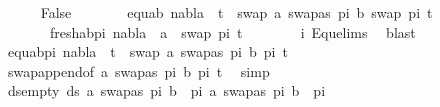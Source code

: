 \begin{isabellebody}
\isanewline
\ \ \ \ \isamarkupfalse%
\ False\isanewline
\ \ \ \ \isamarkupfalse%
\ \isamarkupfalse%
\ equ{\isacharunderscore}{\kern0pt}ab{\isacharcolon}{\kern0pt}\ {\isachardoublequoteopen}nabla\ {\isasymturnstile}\ t{}{\isacharprime}{\kern0pt}\ {\isasymapprox}\ swap\ {\isacharbrackleft}{\kern0pt}{\isacharparenleft}{\kern0pt}a{\isacharcomma}{\kern0pt}\ swapas\ pi{}\ b{\isacharparenright}{\kern0pt}{\isacharbrackright}{\kern0pt}\ {\isacharparenleft}{\kern0pt}swap\ pi{}\ t{}{\isacharprime}{\kern0pt}{\isacharparenright}{\kern0pt}{\isachardoublequoteclose}\ \isanewline
\ \ \ \ \ \ \ fresh{\isacharunderscore}{\kern0pt}ab{\isacharunderscore}{\kern0pt}pi{}{\isacharcolon}{\kern0pt}\ {\isachardoublequoteopen}nabla\ {\isasymturnstile}\ a\ {\isasymsharp}\ swap\ pi{}\ t{}{\isacharprime}{\kern0pt}{\isachardoublequoteclose}\isanewline
\ \ \ \ \ \ \isamarkupfalse%
\ i\ Equ{\isacharunderscore}{\kern0pt}elims{\isacharparenleft}{\kern0pt}{}{\isacharparenright}{\kern0pt}\ \isamarkupfalse%
\ blast{\isacharplus}{\kern0pt}\isanewline
\isanewline
\ \ \ \ \isamarkupfalse%
\ \isamarkupfalse%
\ equ{\isacharunderscore}{\kern0pt}ab{\isacharunderscore}{\kern0pt}pi{}{\isacharcolon}{\kern0pt}\ {\isachardoublequoteopen}nabla\ {\isasymturnstile}\ t{}{\isacharprime}{\kern0pt}\ {\isasymapprox}\ swap\ {\isacharparenleft}{\kern0pt}{\isacharbrackleft}{\kern0pt}{\isacharparenleft}{\kern0pt}a{\isacharcomma}{\kern0pt}\ swapas\ pi{}\ b{\isacharparenright}{\kern0pt}{\isacharbrackright}{\kern0pt}{\isacharat}{\kern0pt}\ pi{}{\isacharparenright}{\kern0pt}\ t{}{\isacharprime}{\kern0pt}{\isachardoublequoteclose}\isanewline
\ \ \ \ \ \ \isamarkupfalse%
\ swap{\isacharunderscore}{\kern0pt}append{\isacharbrackleft}{\kern0pt}of\ {\isacartoucheopen}{\isacharbrackleft}{\kern0pt}{\isacharparenleft}{\kern0pt}a{\isacharcomma}{\kern0pt}\ swapas\ pi{}\ b{\isacharparenright}{\kern0pt}{\isacharbrackright}{\kern0pt}{\isacartoucheclose}\ pi{}\ t{}{\isacharprime}{\kern0pt}{\isacharbrackright}{\kern0pt}\ \isamarkupfalse%
\ simp\isanewline
\isanewline
\ \ \ \ \isamarkupfalse%
\ ds{\isacharunderscore}{\kern0pt}empty{\isacharcolon}{\kern0pt}\ {\isachardoublequoteopen}ds\ {\isacharparenleft}{\kern0pt}{\isacharbrackleft}{\kern0pt}{\isacharparenleft}{\kern0pt}a{\isacharcomma}{\kern0pt}\ swapas\ pi{}\ b{\isacharparenright}{\kern0pt}{\isacharbrackright}{\kern0pt}\ {\isacharat}{\kern0pt}\ pi{}{\isacharparenright}{\kern0pt}\ {\isacharparenleft}{\kern0pt}{\isacharbrackleft}{\kern0pt}{\isacharparenleft}{\kern0pt}a{\isacharcomma}{\kern0pt}\ swapas\ pi{}\ b{\isacharparenright}{\kern0pt}{\isacharbrackright}{\kern0pt}\ {\isacharat}{\kern0pt}\ pi{}{\isacharparenright}{\kern0pt}\ {\isacharequal}{\kern0pt}\ {\isacharbraceleft}{\kern0pt}{\isacharbraceright}{\kern0pt}{\isachardoublequoteclose}\isanewline

\end{isabellebody}
